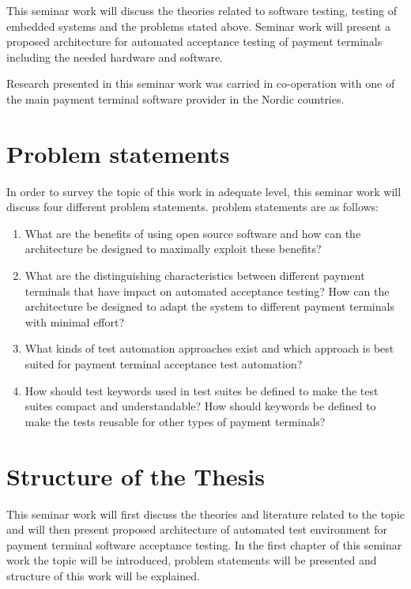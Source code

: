 This seminar work will discuss the theories related to software testing, testing of embedded systems and the problems stated above. Seminar work will present a proposed architecture for automated acceptance testing of payment terminals including the needed hardware and software.

Research presented in this seminar work was carried in co-operation with one of the main payment terminal software provider in the Nordic countries.

\section{Problem statements}

In order to survey the topic of this work in adequate level, this seminar work will discuss four different problem statements. problem statements are as follows:
\begin{enumerate}
\item What are the benefits of using open source software and how can the architecture be designed to maximally exploit these benefits?
\item What are the distinguishing characteristics between different payment terminals that have impact on automated acceptance testing? How can the architecture be designed to adapt the system to different payment terminals with minimal effort?
\item What kinds of test automation approaches exist and which approach is best suited for payment terminal acceptance test automation?
\item How should test keywords used in test suites be defined to make
the test suites compact and understandable? How should keywords be defined to make the tests reusable for other types of payment terminals?
\end{enumerate}

\section{Structure of the Thesis}
\label{section:structure} 

This seminar work will first discuss the theories and literature related to the topic and will then present proposed architecture of automated test environment for payment terminal software acceptance testing. In the first chapter of this seminar work the topic will be introduced, problem statements will be presented and structure of this work will be explained.

